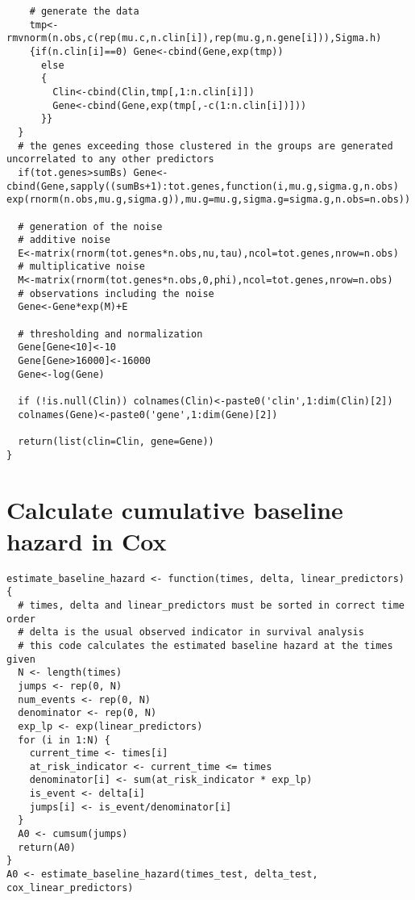 \begin{lstlisting}
    # generate the data
    tmp<-rmvnorm(n.obs,c(rep(mu.c,n.clin[i]),rep(mu.g,n.gene[i])),Sigma.h)
    {if(n.clin[i]==0) Gene<-cbind(Gene,exp(tmp))
      else
      {
        Clin<-cbind(Clin,tmp[,1:n.clin[i]])
        Gene<-cbind(Gene,exp(tmp[,-c(1:n.clin[i])]))
      }}
  }
  # the genes exceeding those clustered in the groups are generated uncorrelated to any other predictors
  if(tot.genes>sumBs) Gene<-cbind(Gene,sapply((sumBs+1):tot.genes,function(i,mu.g,sigma.g,n.obs) exp(rnorm(n.obs,mu.g,sigma.g)),mu.g=mu.g,sigma.g=sigma.g,n.obs=n.obs))

  # generation of the noise
  # additive noise
  E<-matrix(rnorm(tot.genes*n.obs,nu,tau),ncol=tot.genes,nrow=n.obs)
  # multiplicative noise
  M<-matrix(rnorm(tot.genes*n.obs,0,phi),ncol=tot.genes,nrow=n.obs)
  # observations including the noise
  Gene<-Gene*exp(M)+E

  # thresholding and normalization
  Gene[Gene<10]<-10
  Gene[Gene>16000]<-16000
  Gene<-log(Gene)

  if (!is.null(Clin)) colnames(Clin)<-paste0('clin',1:dim(Clin)[2])
  colnames(Gene)<-paste0('gene',1:dim(Gene)[2])

  return(list(clin=Clin, gene=Gene))
}
\end{lstlisting}

\newpage
\section{Calculate cumulative baseline hazard in Cox}
\label{code:cumulative-baseline-hazard}
\begin{lstlisting}
estimate_baseline_hazard <- function(times, delta, linear_predictors) {
  # times, delta and linear_predictors must be sorted in correct time order
  # delta is the usual observed indicator in survival analysis
  # this code calculates the estimated baseline hazard at the times given
  N <- length(times)
  jumps <- rep(0, N)
  num_events <- rep(0, N)
  denominator <- rep(0, N)
  exp_lp <- exp(linear_predictors)
  for (i in 1:N) {
    current_time <- times[i]
    at_risk_indicator <- current_time <= times
    denominator[i] <- sum(at_risk_indicator * exp_lp)
    is_event <- delta[i]
    jumps[i] <- is_event/denominator[i]
  }
  A0 <- cumsum(jumps)
  return(A0)
}
A0 <- estimate_baseline_hazard(times_test, delta_test, cox_linear_predictors)
\end{lstlisting}